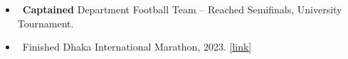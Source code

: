 
\begin{itemize}
    \item[] \textbullet\, \textbf{Captained} Department Football Team – Reached Semifinals, University Tournament.
    \item[] \textbullet\, Finished Dhaka International Marathon, 2023. \href{https://1drv.ms/i/c/919fe16e04062443/EQCMecKwq51KuQRt6hvSfHgBY84gDe75hKQK3QkAPihAIg?e=j88miu}{[link]} 
\end{itemize}






